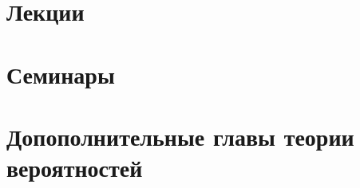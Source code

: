 \documentclass[a4paper,12pt]{book}
\begin{document}
    \pagestyle{empty}
    \titlepage
    \tableofcontents

    \chapter{Лекции}
    \pagestyle{fancy}
    
    
    
    
    
    
    
    
    
    
    
    
    

    \pagestyle{empty}
    \chapter{Семинары}
    \pagestyle{fancy}
    
    
    
    
    
    
    
    
    

    \setcounter{theorem}{0}
    \setcounter{definition}{0}
    \pagestyle{empty}
    \chapter{Допополнительные главы теории вероятностей}
    \pagestyle{fancy}
    
    
\end{document}

